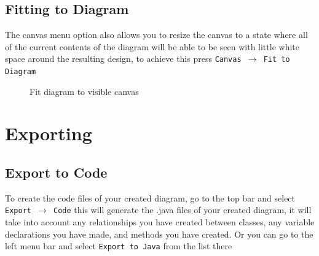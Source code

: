 \documentclass[a4paper]{article}
\begin{document}
\subsection{Fitting to Diagram} 
The canvas menu option also allows you to resize the canvas to a state where all of the current contents of the diagram will be able to be seen with little white space around the resulting design, to achieve this press \texttt{Canvas
$\rightarrow$ Fit to Diagram}
\begin{figure}[H] \begin{center}

\label{fig:fitDiagram}
\caption{Fit diagram to visible canvas}
\vspace{-20pt}
\end{center} \end{figure} 
\newpage
\section{Exporting}
\subsection{Export to Code} 
To create the code files of your created diagram, go to the top bar and select \texttt{Export $\rightarrow$ Code} this will generate the .java files of your created diagram, it will take into account any relationships you have created
between classes, any variable declarations you have made, and methods you have created. Or you can go to the left menu bar and select \texttt{Export to Java} from the list there
\end{document}
